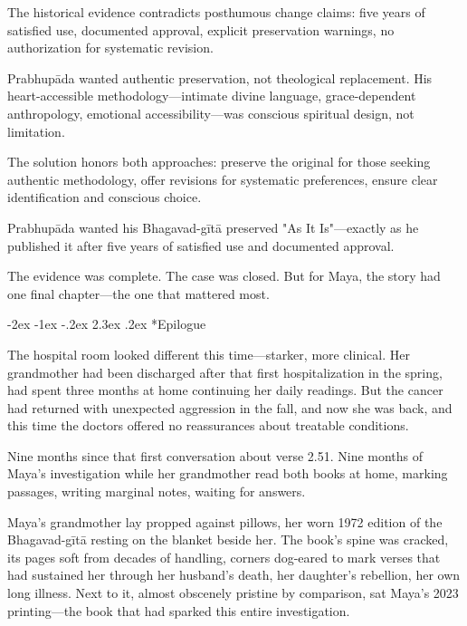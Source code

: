 \documentclass[12pt,twoside]{book}
\makeatletter
\renewcommand\section{\@startsection{section}{1}{\z@}%
{-2ex \@plus -1ex \@minus -.2ex}%
{2.3ex \@plus.2ex}%
{\normalfont\Large\bfseries}}
\makeatother
\begin{document}
The historical evidence contradicts posthumous change claims: five years of satisfied use, documented approval, explicit preservation warnings, no authorization for systematic revision.

Prabhupāda wanted authentic preservation, not theological replacement. His heart-accessible methodology—intimate divine language, grace-dependent anthropology, emotional accessibility—was conscious spiritual design, not limitation.

The solution honors both approaches: preserve the original for those seeking authentic methodology, offer revisions for systematic preferences, ensure clear identification and conscious choice.

Prabhupāda wanted his Bhagavad-gītā preserved "As It Is"—exactly as he published it after five years of satisfied use and documented approval.

The evidence was complete. The case was closed. But for Maya, the story had one final chapter—the one that mattered most.

\clearpage
{}
\section*{Epilogue}
\thispagestyle{chapterpage}

\normalfont\justifying

The hospital room looked different this time—starker, more clinical. Her grandmother had been discharged after that first hospitalization in the spring, had spent three months at home continuing her daily readings. But the cancer had returned with unexpected aggression in the fall, and now she was back, and this time the doctors offered no reassurances about treatable conditions.

Nine months since that first conversation about verse 2.51. Nine months of Maya's investigation while her grandmother read both books at home, marking passages, writing marginal notes, waiting for answers.

Maya's grandmother lay propped against pillows, her worn 1972 edition of the Bhagavad-gītā resting on the blanket beside her. The book's spine was cracked, its pages soft from decades of handling, corners dog-eared to mark verses that had sustained her through her husband's death, her daughter's rebellion, her own long illness. Next to it, almost obscenely pristine by comparison, sat Maya's 2023 printing—the book that had sparked this entire investigation.
\end{document}
